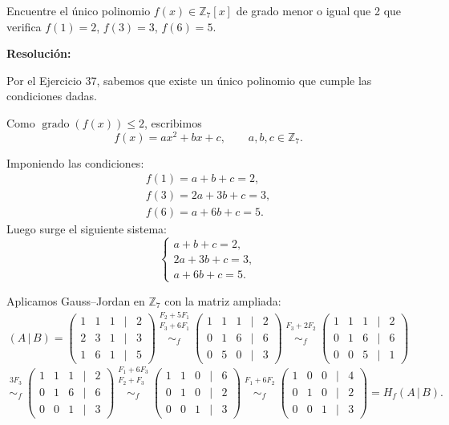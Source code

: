 \documentclass[a4paper,12pt]{article}
\begin{document}
\begin{ejercicio}[title=Ejercicio 38]
Encuentre el único polinomio $f(x) \in \mathbb{Z}_7[x]$ de grado menor o igual que 2 que verifica $f(1)=2$, $f(3)=3$, $f(6)=5$.

\tcblower
\textbf{Resolución:}

Por el Ejercicio 37, sabemos que existe un único polinomio que cumple las condiciones dadas.

Como $\operatorname{grado}(f(x))\le 2$, escribimos
\[
f(x)=ax^2+bx+c,\qquad a,b,c\in\mathbb{Z}_7.
\]

Imponiendo las condiciones:
\[
\begin{aligned}
f(1)=a+b+c=2,\\
f(3)=2a+3b+c=3,\\
f(6)=a+6b+c=5.
\end{aligned}
\]
Luego surge el siguiente sistema:
\[
\begin{cases}
a+b+c=2,\\
2a+3b+c=3,\\
a+6b+c=5.
\end{cases}
\]

Aplicamos Gauss--Jordan en $\mathbb{Z}_7$ con la matriz ampliada:
\[
(A\,|\,B)=
\begin{pmatrix}
1 & 1 & 1 &\Big|& 2\\
2 & 3 & 1 &\Big|& 3\\
1 & 6 & 1 &\Big|& 5
\end{pmatrix}
\overset{\substack{F_2+5F_1\\F_3+6F_1\\{}}}{\sim_f}
\begin{pmatrix}
1 & 1 & 1 &\Big|& 2\\
0 & 1 & 6 &\Big|& 6\\
0 & 5 & 0 &\Big|& 3
\end{pmatrix}
\overset{\substack{F_3+2F_2\\{}}}{\sim_f}
\begin{pmatrix}
1 & 1 & 1 &\Big|& 2\\
0 & 1 & 6 &\Big|& 6\\
0 & 0 & 5 &\Big|& 1
\end{pmatrix}
\]
\[
\overset{\substack{3F_3\\{}}}{\sim_f}
\begin{pmatrix}
1 & 1 & 1 &\Big|& 2\\
0 & 1 & 6 &\Big|& 6\\
0 & 0 & 1 &\Big|& 3
\end{pmatrix}
\overset{\substack{F_1+6F_3\\F_2+F_3\\{}}}{\sim_f}
\begin{pmatrix}
1 & 1 & 0 &\Big|& 6\\
0 & 1 & 0 &\Big|& 2\\
0 & 0 & 1 &\Big|& 3
\end{pmatrix}
\overset{\substack{F_1+6F_2\\{}}}{\sim_f}
\begin{pmatrix}
1 & 0 & 0 &\Big|& 4\\
0 & 1 & 0 &\Big|& 2\\
0 & 0 & 1 &\Big|& 3
\end{pmatrix}
= H_f(A\,|\,B).
\]


\end{ejercicio}
\end{document}
